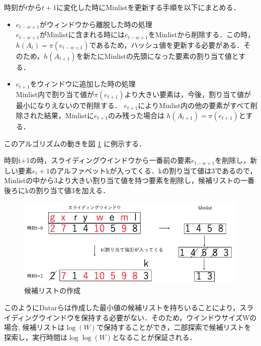 時刻が$t$から$t+1$に変化した時にMinlistを更新する手順を以下にまとめる．
\begin{itemize}
\item $e_{t-w+1}$がウィンドウから離脱した時の処理\\
$e_{t-w+1}$がMinlistに含まれる時には$e_{t-w+1}$をMinlistから削除する．この時，$h(A_t)=\pi(e_{t-w+1})$であるため，ハッシュ値を更新する必要がある．そのため，$h(A_{t+1})$を新たにMinlistの先頭になった要素の割り当て値とする．
\item $e_{t+1}$をウィンドウに追加した時の処理\\
Minlist内で割り当て値が$\pi(e_{t+1})$より大きい要素は，今後，割り当て値が最小になりえないので削除する．
$e_{t+1}$によりMinlist内の他の要素がすべて削除された結果，Minlistに$e_{t+1}$のみ残った場合は
$h(A_{t+1})=\pi({e_{t+1}})$とする．
\end{itemize}


このアルゴリズムの動きを図 \ref{fig:koho2} に例示する．


時刻t+1の時，スライディングウインドウから一番前の要素$e_{t-w+1}$を削除し，新しい要素$e_t+1$のアルファベットkが入ってくる．kの割り当て値は3であるので，Minlistの中から3より大きい割り当て値を持つ要素を削除し，候補リストの一番後ろにkの割り当て値3を加える．


\begin{figure}[H]
 \centering
 \includegraphics[width=15cm]{koho2.png}
 \caption{候補リストの作成}
 \label{fig:koho2}
\end{figure}

このようにDatarらは作成した最小値の候補リストを持ちいることにより，スライディングウインドウを保持する必要がない．そのため，ウインドウサイズWの場合, 候補リストは$\log(W)$で保持することができ，二部探索で候補リストを探索し，実行時間は$\log\log(W)$となることが保証される．
